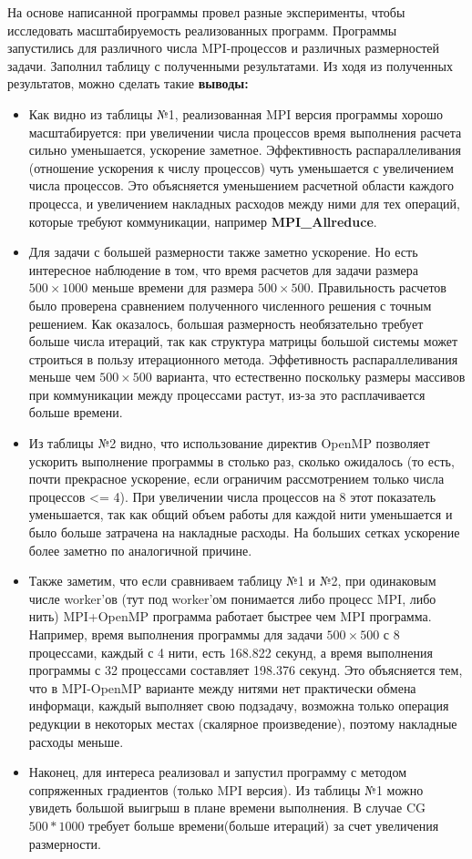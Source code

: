 \documentclass{article}
\begin{document}
На основе написанной программы провел разные эксперименты, чтобы исследовать масштабируемость реализованных программ. Программы запустились для различного числа MPI-процессов и различных размерностей задачи. Заполнил таблицу с полученными результатами. Из ходя из полученных результатов, можно сделать такие \textbf{выводы:}
\begin{itemize}
    \item Как видно из таблицы №1, реализованная MPI версия программы хорошо масштабируется: при увеличении числа процессов время выполнения расчета сильно уменьшается, ускорение заметное. Эффективность распараллеливания (отношение ускорения к числу процессов) чуть уменьшается с увеличением числа процессов. Это объясняется уменьшением расчетной области каждого процесса, и увеличением накладных расходов между ними для тех операций, которые требуют коммуникации, например \textbf{MPI\_Allreduce}. 
    \item Для задачи с большей размерности также заметно ускорение. Но есть интересное наблюдение в том, что время расчетов для задачи размера $500\times 1000$ меньше времени для размера $500\times 500$. Правильность расчетов было проверена сравнением полученного численного решения с точным решением. Как оказалось, большая размерность необязательно требует больше числа итераций, так как структура матрицы большой системы может строиться в пользу итерационного метода. Эффетивность распараллеливания меньше чем $500\times 500$ варианта, что естественно поскольку размеры массивов при коммуникации между процессами растут, из-за это расплачивается больше времени.
    \item Из таблицы №2 видно, что использование директив OpenMP позволяет ускорить выполнение программы в столько раз, сколько ожидалось (то есть, почти прекрасное ускорение, если ограничим рассмотрением только числа процессов <= 4). При увеличении числа процессов на $8$ этот показатель уменьшается, так как общий объем работы для каждой нити уменьшается и было больше затрачена на накладные расходы. На больших сетках ускорение более заметно по аналогичной причине.
    \item Также заметим, что если сравниваем таблицу №1 и №2, при одинаковым числе worker'ов (тут под worker'ом понимается либо процесс MPI, либо нить) MPI+OpenMP программа работает быстрее чем MPI программа. Например, время выполнения программы для задачи $500\times 500$ с 8 процессами, каждый с 4 нити, есть 168.822 секунд, а время выполнения программы с 32 процессами составляет 198.376 секунд. Это объясняется тем, что в MPI-OpenMP варианте между нитями нет практически обмена информаци, каждый выполняет свою подзадачу, возможна только операция редукции в некоторых местах (скалярное произведение), поэтому накладные расходы меньше.
    \item Наконец, для интереса реализовал и запустил программу с методом сопряженных градиентов (только MPI версия). Из таблицы №1 можно увидеть большой выигрыш в плане времени выполнения. В случае CG $500*1000$ требует больше времени(больше итераций) за счет увеличения размерности.
\end{itemize}
\end{document}
